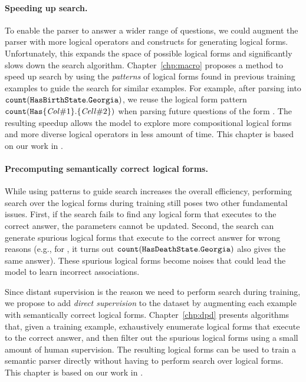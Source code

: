 \paragraph{Speeding up search.}
To enable the parser to answer a wider range of questions,
we could augment the parser with more logical operators
and constructs for generating logical forms.
Unfortunately, this expands the space of possible logical forms
and significantly slows down the search algorithm.
Chapter~\ref{chp:macro}
proposes a method to speed up search by using
the \emph{patterns} of logical forms
found in previous training examples
to guide the search for similar examples.
For example,
after parsing 
into 
$\texttt{count}(\texttt{Has}{\texttt{BirthState}}.\texttt{Georgia})$,
we reuse the logical form pattern
$\texttt{count}(\texttt{Has}{\{\text{\emph{Col}}\#1\}}.\{\text{\emph{Cell}}\#2\})$
when parsing future questions of the form
.
The resulting speedup allows the model
to explore more compositional logical forms
and more diverse logical operators
in less amount of time.
This chapter is based on our work in
\citet{zhang2017macro}.

\paragraph{Precomputing semantically correct logical forms.}
While using patterns to guide search
increases the overall efficiency,
performing search over the logical forms during training
still poses two other fundamental issues.
First,
if the search fails to find any logical form that executes
to the correct answer,
the parameters cannot be updated.
Second,
the search can generate spurious logical forms
that execute to the correct answer for wrong reasons
(e.g., for ,
it turns out
$\texttt{count}(\texttt{Has}{\texttt{DeathState}}.\texttt{Georgia})$
also gives the same answer).
These spurious logical forms become noises that could lead
the model to learn incorrect associations.

Since distant supervision is the reason
we need to perform search during training,
we propose to add \emph{direct supervision} to the dataset
by augmenting each example with
semantically correct logical forms.
Chapter~\ref{chp:dpd}
presents algorithms
that,
given a training example,
exhaustively
enumerate logical forms
that execute to the correct answer,
and then filter out the spurious logical forms
using a small amount of human supervision.
The resulting logical forms can be used to train
a semantic parser directly
without having to perform search over logical forms.
This chapter is based on our work in
\citet{pasupat2016inferring}.
